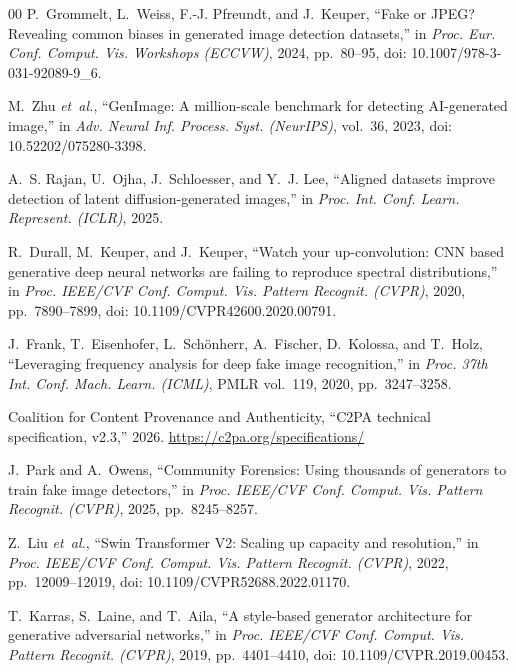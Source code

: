 \documentclass[conference]{IEEEtran}
\begin{document}
\begin{thebibliography}{00}
 P.~Grommelt, L.~Weiss, F.-J. Pfreundt, and J.~Keuper,
``Fake or JPEG? Revealing common biases in generated image detection
datasets,'' in \emph{Proc. Eur. Conf. Comput. Vis. Workshops (ECCVW)}, 2024,
pp.~80--95, doi: 10.1007/978-3-031-92089-9\_6.

 M.~Zhu \emph{et~al.}, ``GenImage: A million-scale benchmark
for detecting AI-generated image,'' in \emph{Adv. Neural Inf. Process. Syst. (NeurIPS)}, vol.~36, 2023, doi: 10.52202/075280-3398.

 A.~S. Rajan, U.~Ojha, J.~Schloesser, and Y.~J. Lee,
``Aligned datasets improve detection of latent diffusion-generated images,'' in
\emph{Proc. Int. Conf. Learn. Represent. (ICLR)}, 2025.

 R.~Durall, M.~Keuper, and J.~Keuper, ``Watch your
up-convolution: CNN based generative deep neural networks are failing to
reproduce spectral distributions,'' in \emph{Proc. IEEE/CVF Conf. Comput. Vis. Pattern Recognit. (CVPR)}, 2020, pp.~7890--7899,
doi: 10.1109/CVPR42600.2020.00791.

 J.~Frank, T.~Eisenhofer, L.~Sch\"onherr, A.~Fischer,
D.~Kolossa, and T.~Holz, ``Leveraging frequency analysis for deep fake image
recognition,'' in \emph{Proc. 37th Int. Conf. Mach. Learn. (ICML)}, PMLR
vol.~119, 2020, pp.~3247--3258.

 Coalition for Content Provenance and Authenticity, ``C2PA
technical specification, v2.3,'' 2026. \url{https://c2pa.org/specifications/}

 J.~Park and A.~Owens, ``Community Forensics: Using
thousands of generators to train fake image detectors,'' in \emph{Proc.
IEEE/CVF Conf. Comput. Vis. Pattern Recognit. (CVPR)}, 2025,
pp.~8245--8257.

 Z.~Liu \emph{et~al.}, ``Swin Transformer V2: Scaling up
capacity and resolution,'' in \emph{Proc. IEEE/CVF Conf. Comput. Vis. Pattern Recognit. (CVPR)}, 2022, pp.~12009--12019,
doi: 10.1109/CVPR52688.2022.01170.

 T.~Karras, S.~Laine, and T.~Aila, ``A style-based
generator architecture for generative adversarial networks,'' in \emph{Proc.
IEEE/CVF Conf. Comput. Vis. Pattern Recognit. (CVPR)}, 2019,
pp.~4401--4410, doi: 10.1109/CVPR.2019.00453.

\end{thebibliography}
\end{document}
